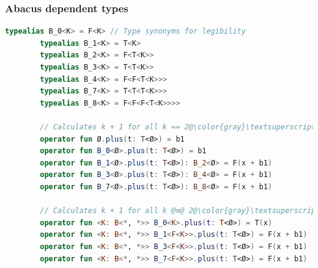 \documentclass{beamer}
\begin{document}
    \begin{frame}[fragile]
        \frametitle{Abacus dependent types}
        \begin{lstlisting}[language=Kotlin, gobble=7]
        typealias B_0<K> = F<K> // Type synonyms for legibility
        typealias B_1<K> = T<K>
        typealias B_2<K> = F<T<K>>
        typealias B_3<K> = T<T<K>>
        typealias B_4<K> = F<F<T<K>>>
        typealias B_7<K> = T<T<T<K>>>
        typealias B_8<K> = F<F<F<T<K>>>>

        // Calculates k + 1 for all k == 2@\color{gray}\textsuperscript{n}@ - 1, 0 <= n < 4
        operator fun Ø.plus(t: T<Ø>) = b1
        operator fun B_0<Ø>.plus(t: T<Ø>) = b1
        operator fun B_1<Ø>.plus(t: T<Ø>): B_2<Ø> = F(x + b1)
        operator fun B_3<Ø>.plus(t: T<Ø>): B_4<Ø> = F(x + b1)
        operator fun B_7<Ø>.plus(t: T<Ø>): B_8<Ø> = F(x + b1)

        // Calculates k + 1 for all k @≡@ 2@\color{gray}\textsuperscript{n}@ - 1 (mod 2@\color{gray}\textsuperscript{n+1}@), 1 <= n < 4
        operator fun <K: B<*, *>> B_0<K>.plus(t: T<Ø>) = T(x)
        operator fun <K: B<*, *>> B_1<F<K>>.plus(t: T<Ø>) = F(x + b1)
        operator fun <K: B<*, *>> B_3<F<K>>.plus(t: T<Ø>) = F(x + b1)
        operator fun <K: B<*, *>> B_7<F<K>>.plus(t: T<Ø>) = F(x + b1)
        \end{lstlisting}
    \end{frame}
\end{document}

